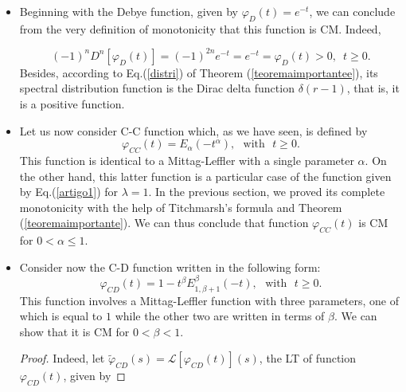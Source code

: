 \documentclass[12pt]{amsart}
\numberwithin{equation}{section}
\begin{document}
\begin{itemize}

\item Beginning with the Debye function, given by $\varphi_{D}(t)=e^{-t}$,
	we can conclude from the very definition of monotonicity that this
		function is CM. Indeed, 

\begin{equation}
(-1)^{n}D^{n}[\varphi_{D}(t)]=(-1)^{2n}e^{-t}=e^{-t}=\varphi_{D}(t)>0,\,\,\,t\geq0.
\end{equation}
Besides, according to 
Eq.(\ref{distri}) of Theorem (\ref{teoremaimportantee}),
its spectral distribution function is the Dirac delta
function $\delta(r-1)$, that is, it is a positive function. 

\item Let us now consider C-C function which, as we have seen, is defined
	by 
\begin{equation}
\varphi_{CC}(t)=E_{\alpha}(-t^{\alpha}),\,\,\,\,\mbox{with}\,\,\,\,t\geq0.
\end{equation}
This function is identical to a Mittag-Leffler with a single parameter
		$\alpha$. On the other hand, this latter function is a
		particular case of the function given by Eq.(\ref{artigo1})
		for $\lambda=1$. In the previous section, we proved its
		complete monotonicity with the help of Titchmarsh's formula
		and Theorem (\ref{teoremaimportante}). We can thus conclude
		that function $\varphi_{CC}(t)$ is CM for $0<\alpha\leq1$.\\

\item Consider now the C-D function written in the following form: 
\begin{equation}
\varphi_{CD}(t)=1-t^{\beta}E_{1,\beta+1}^{\beta}(-t),\,\,\,\,
	\mbox{with}\,\,\,\,t\geq0.
\end{equation}
This function involves a Mittag-Leffler function with three parameters, one
		of which is equal to $1$ while the other two are written in
		terms of $\beta$. We can show that it is CM for $0 < \beta <
		1$. 
\begin{proof}

Indeed, let $\tilde{\varphi}_{CD}(s)=\mathscr{L}[\varphi_{CD}(t)](s)$, the
LT of function $\varphi_{CD}(t)$, given by 


\end{proof}
\end{itemize}
\end{document}
